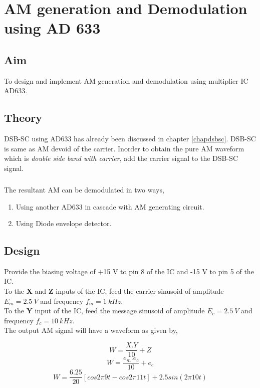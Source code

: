 
\chapter[AM generation and Demodulation using AD 633]{AM generation and Demodulation using AD 633}
\section*{Aim}
To design and implement AM generation and demodulation using multiplier IC AD633.
\section*{Theory}
DSB-SC using AD633 has already been discussed in chapter \ref{chapdsbsc}. DSB-SC is same as AM devoid of the carrier. Inorder to obtain the pure AM waveform which is \emph{double side band with carrier}, add the carrier signal to the DSB-SC signal.
\paragraph{}
	The resultant AM can be demodulated in two ways,
 \begin{enumerate}
\item
Using another AD633 in cascade with AM generating circuit.
\item
Using Diode envelope detector.

\end{enumerate}
\section*{Design}
Provide the biasing voltage of +15 V to pin 8 of the IC and -15 V to pin 5 of the IC.\\

To the \textbf{X} and \textbf{Z} inputs of the IC, feed the carrier sinusoid of amplitude $E_m=2.5\ V$ and frequency $f_m= 1\ kHz$.\\
To the \textbf{Y} input of the IC, feed the message sinusoid of amplitude $E_c=2.5\ V$ and frequency $f_c= 10\ kHz$.\\

The output AM signal will have a waveform as given by,

\begin{equation}
W=\frac{X.Y}{10}+Z
\end{equation}
\begin{equation}
W=\frac{e_m.e_c}{10}+e_c
\end{equation}
\begin{equation}
W=\frac{6.25}{20}[cos 2\pi 9t-cos 2\pi 11t]+2.5 sin(2\pi10t)
\end{equation}

